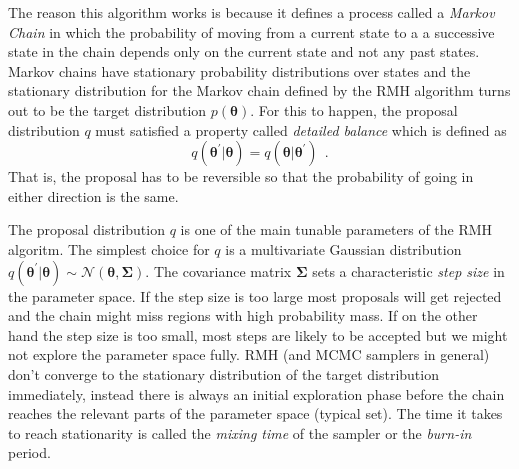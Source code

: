 \documentclass[12pt,dvipsnames]{report}
\renewcommand{\vec}[1]{\boldsymbol{\mathbf{#1}}}
\newcommand{\hquad}{~~}
\begin{document}
The reason this algorithm works is because it defines a process called a 
\textsl{Markov Chain} in which the probability of moving from a current state to a
a successive state in the chain depends only on the current state and not any
past states.
Markov chains have stationary probability distributions over states and the stationary
distribution for the Markov chain defined by the RMH algorithm turns out to be
the target distribution $p(\bm\theta)$.
For this to happen, the proposal distribution $q$ must satisfied a property
called \textsl{detailed balance} which is defined as
\begin{equation}
    q(\bm\theta^\prime\lvert\bm\theta)=q(\bm\theta\lvert\bm\theta^\prime)\hquad .
\end{equation}
That is, the proposal has to be reversible so that the probability of going in either 
direction is the same. 

The proposal distribution $q$ is one of the main tunable parameters
of the RMH algoritm.
The simplest choice for $q$ is a multivariate Gaussian distribution
 $q(\bm\theta^\prime\lvert\bm\theta)\sim\mathcal{N}(\bm\theta,\vec \Sigma)$.
 The covariance matrix $\vec \Sigma$ sets a characteristic 
\textsl{step size} in the parameter space. If the step size is
too large most proposals will get rejected and the chain might miss regions with high
probability mass.
If on the other hand the step size is too small, most steps are likely to be accepted
but we might not explore the parameter space fully.
RMH (and MCMC samplers in general) don't converge to the stationary distribution  
of the target distribution immediately, instead there is always an initial exploration 
phase before the chain reaches the relevant parts of the parameter space 
(typical set).  The time it 
takes to reach stationarity is called the \textsl{mixing time} of the sampler 
or the \textsl{burn-in} period.
\end{document}
